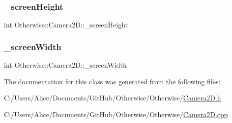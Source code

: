 \subsubsection{\texorpdfstring{\+\_\+screen\+Height}{\_screenHeight}}
{\footnotesize\ttfamily int Otherwise\+::\+Camera2\+D\+::\+\_\+screen\+Height\hspace{0.3cm}{\ttfamily [private]}}

\mbox{\label{class_otherwise_1_1_camera2_d_a568bfdd6c1ae38b02b6936d9ece07e28}} 
\subsubsection{\texorpdfstring{\+\_\+screen\+Width}{\_screenWidth}}
{\footnotesize\ttfamily int Otherwise\+::\+Camera2\+D\+::\+\_\+screen\+Width\hspace{0.3cm}{\ttfamily [private]}}



The documentation for this class was generated from the following files\+:\begin{DoxyCompactItemize}
\item 
C\+:/\+Users/\+Alice/\+Documents/\+Git\+Hub/\+Otherwise/\+Otherwise/\hyperlink{_camera2_d_8h}{Camera2\+D.\+h}\item 
C\+:/\+Users/\+Alice/\+Documents/\+Git\+Hub/\+Otherwise/\+Otherwise/\hyperlink{_camera2_d_8cpp}{Camera2\+D.\+cpp}\end{DoxyCompactItemize}
